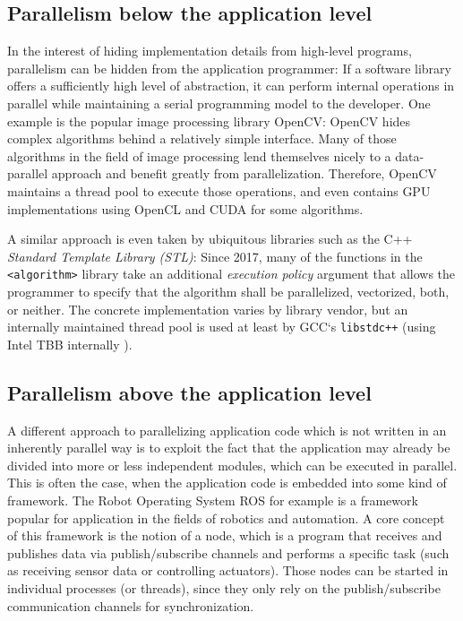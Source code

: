 \documentclass[BCOR20mm,DIV14,10pt,headinclude,footexclude,bibtotoc,liststotoc]{article}
\begin{document}
\subsection{Parallelism below the application level}
In the interest of hiding implementation details from high-level programs,
parallelism can be hidden from the application programmer: If a software library
offers a sufficiently high level of abstraction, it can perform internal
operations in parallel while maintaining a serial programming model to the
developer. One example is the popular image processing library OpenCV: OpenCV
hides complex algorithms behind a relatively simple interface. Many of those
algorithms in the field of image processing lend themselves nicely to a
data-parallel approach and benefit greatly from parallelization. Therefore,
OpenCV maintains a thread pool to execute those operations, and even contains
GPU implementations using OpenCL and CUDA for some algorithms.

A similar approach is even taken by ubiquitous libraries such as the C++
\emph{Standard Template Library (STL)}: Since 2017, many of the functions in the
\texttt{<algorithm>} library take an additional \textit{execution policy}
argument that allows the programmer to specify that the algorithm shall be
parallelized, vectorized, both, or neither. The concrete implementation varies
by library vendor, but an internally maintained thread pool is used at least by
GCC`s \texttt{libstdc++} (using Intel TBB internally \cite{libstdc++}).

\subsection{Parallelism above the application level}
A different approach to parallelizing application code which is not written in
an inherently parallel way is to exploit the fact that the application may
already be divided into more or less independent modules, which can be executed
in parallel. This is often the case, when the application code is embedded into
some kind of framework. The Robot Operating System ROS for example is a
framework popular for application in the fields of robotics and automation. A
core concept of this framework is the notion of a node, which is a program that
receives and publishes data via publish/subscribe channels and performs a
specific task (such as receiving sensor data or controlling actuators). Those
nodes can be started in individual processes (or threads), since they only rely
on the publish/subscribe communication channels for synchronization.
\end{document}
